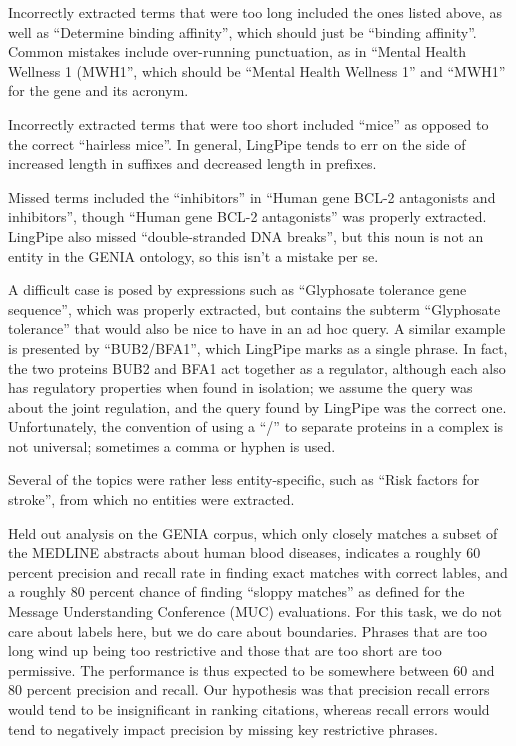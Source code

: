 \documentclass[11pt,oneside]{article}
\begin{document}
Incorrectly extracted terms that were too long included the ones
listed above, as well as ``Determine binding affinity'', which should
just be ``binding affinity''.  Common mistakes include over-running
punctuation, as in ``Mental Health Wellness 1 (MWH1'', which should be
``Mental Health Wellness 1'' and ``MWH1'' for the gene and its
acronym.

Incorrectly extracted terms that were too short included ``mice'' as
opposed to the correct ``hairless mice''.  In general, LingPipe tends
to err on the side of increased length in suffixes and decreased
length in prefixes.

Missed terms included the ``inhibitors'' in ``Human gene BCL-2
antagonists and inhibitors'', though ``Human gene BCL-2 antagonists''
was properly extracted.  LingPipe also missed ``double-stranded DNA
breaks'', but this noun is not an entity in the GENIA ontology, so
this isn't a mistake per se.

A difficult case is posed by expressions such as ``Glyphosate
tolerance gene sequence'', which was properly extracted, but contains
the subterm ``Glyphosate tolerance'' that would also be nice to have
in an ad hoc query.  A similar example is presented by ``BUB2/BFA1'',
which LingPipe marks as a single phrase.  In fact, the two proteins
BUB2 and BFA1 act together as a regulator, although each also has
regulatory properties when found in isolation; we assume the query was
about the joint regulation, and the query found by LingPipe was the
correct one.  Unfortunately, the convention of using a ``/'' to
separate proteins in a complex is not universal; sometimes a comma or
hyphen is used.

Several of the topics were rather less entity-specific, such as ``Risk
factors for stroke'', from which no entities were extracted.

Held out analysis on the GENIA corpus, which only closely matches a
subset of the MEDLINE abstracts about human blood diseases, indicates
a roughly 60 percent precision and recall rate in finding exact
matches with correct lables, and a roughly 80 percent chance of
finding ``sloppy matches'' as defined for the Message Understanding
Conference (MUC) evaluations.  For this task, we do not care about
labels here, but we do care about boundaries.  Phrases that are too
long wind up being too restrictive and those that are too short are
too permissive.  The performance is thus expected to be somewhere
between 60 and 80 percent precision and recall.  Our hypothesis
was that precision recall errors would tend to be insignificant
in ranking citations, whereas recall errors would tend to
negatively impact precision by missing key restrictive phrases.
\end{document}
